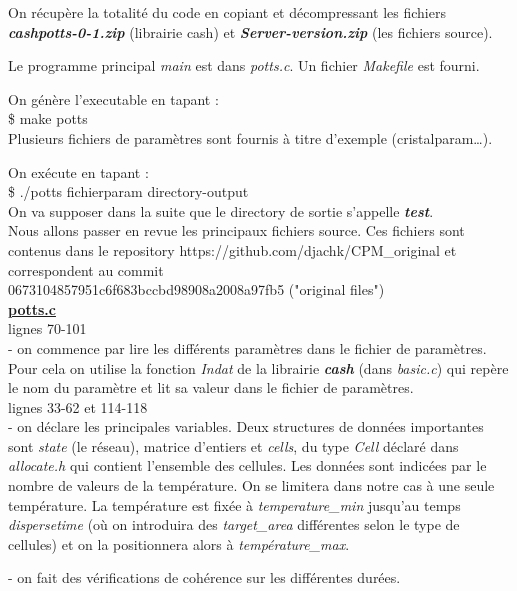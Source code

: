 \documentclass[11pt,a4paper]{article}
\begin{document}
On récupère la totalité du code en copiant et décompressant les fichiers \textbf{\textit{cashpotts-0-1.zip}} (librairie cash) et \textbf{\textit{Server-version.zip}} (les fichiers source).

Le programme principal \textit{main} est dans \textit{potts.c}. Un fichier \textit{Makefile} est fourni.

On génère l’executable en tapant :\\
\$ make potts\\

Plusieurs fichiers de paramètres sont fournis à titre d’exemple (cristalparam…).

On exécute en tapant :\\
\$ ./potts fichierparam directory-output\\
On va supposer dans la suite que le directory de sortie s’appelle \textbf{\textit{test}}.\\
Nous allons passer en revue les principaux fichiers source. Ces fichiers sont contenus dans le repository https://github.com/djachk/CPM\_original et correspondent au commit\\ 0673104857951c6f683bccbd98908a2008a97fb5 ("original files")\\

\underline{\textbf{potts.c}}\\

lignes 70-101\\
- on commence par lire les différents paramètres dans le fichier de paramètres. Pour cela on utilise la fonction \textit{Indat} de la librairie \textbf{\textit{cash}} (dans \textit{basic.c}) qui repère le nom du paramètre et lit sa valeur dans le fichier de paramètres.\\

lignes 33-62 et 114-118\\
- on déclare les principales variables. Deux structures de données importantes sont \textit{state} (le réseau), matrice d’entiers et \textit{cells}, du type \textit{Cell} déclaré dans \textit{allocate.h} qui contient l’ensemble des cellules.
Les données sont indicées par le nombre de valeurs de la température. On se limitera dans notre cas à une seule température. La température est fixée à \textit{temperature\_min} jusqu’au temps \textit{dispersetime} (où on introduira des \textit{target\_area} différentes selon le type de cellules) et on la positionnera alors à \textit{température\_max}.


- on fait des vérifications de cohérence sur les différentes durées.\\
\end{document}
